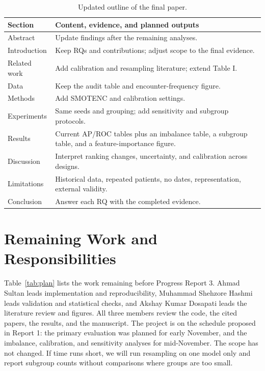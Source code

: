 \documentclass[conference]{IEEEtran}
\begin{document}
\begin{table}[t]\caption{Updated outline of the final paper.}\label{tab:outline}\centering\footnotesize
\begin{tabular}{>{\raggedright\arraybackslash}p{1.65cm}>{\raggedright\arraybackslash}p{5.8cm}}\toprule
Section & Content, evidence, and planned outputs\\\midrule
Abstract & Update findings after the remaining analyses.\\
Introduction & Keep RQs and contributions; adjust scope to the final evidence.\\
Related work & Add calibration and resampling literature; extend Table I.\\
Data & Keep the audit table and encounter-frequency figure.\\
Methods & Add SMOTENC and calibration settings.\\
Experiments & Same seeds and grouping; add sensitivity and subgroup protocols.\\
Results & Current AP/ROC tables plus an imbalance table, a subgroup table, and a feature-importance figure.\\
Discussion & Interpret ranking changes, uncertainty, and calibration across designs.\\
Limitations & Historical data, repeated patients, no dates, representation, external validity.\\
Conclusion & Answer each RQ with the completed evidence.\\\bottomrule
\end{tabular}\end{table}

\section{Remaining Work and Responsibilities}
Table~\ref{tab:plan} lists the work remaining before Progress Report 3. Ahmad Sultan leads implementation and reproducibility, Muhammad Shehzore Hashmi leads validation and statistical checks, and Akshay Kumar Dosapati leads the literature review and figures. All three members review the code, the cited papers, the results, and the manuscript. The project is on the schedule proposed in Report 1: the primary evaluation was planned for early November, and the imbalance, calibration, and sensitivity analyses for mid-November. The scope has not changed. If time runs short, we will run resampling on one model only and report subgroup counts without comparisons where groups are too small.
\end{document}
